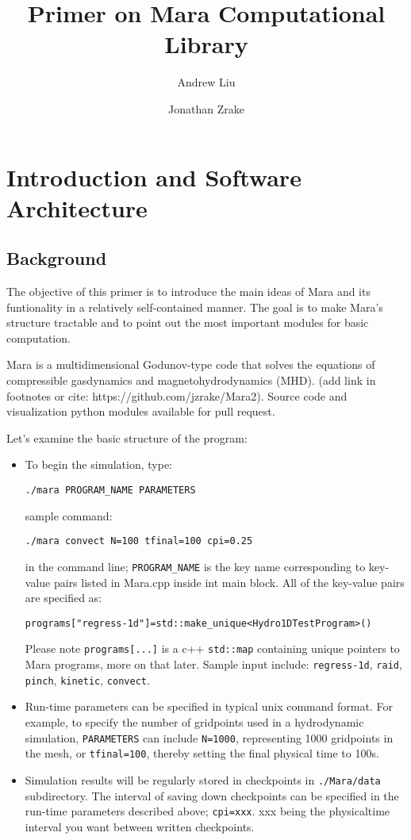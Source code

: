 \documentclass{article}
\title{Primer on Mara Computational Library}
\author{Andrew Liu \and Jonathan Zrake}
\begin{document}
\maketitle

\section{Introduction and Software Architecture}
\subsection{Background}
The objective of this primer is to introduce the main ideas of Mara and its funtionality in a relatively self-contained manner. The goal is to make Mara's structure tractable and to point out the most important modules for basic computation.

Mara is a multidimensional Godunov-type code that solves the equations of
compressible gasdynamics and magnetohydrodynamics (MHD). (add link in footnotes or cite: https://github.com/jzrake/Mara2). Source code and visualization python modules available for pull request.

Let's examine the basic structure of the program:
\begin{itemize}
	\item To begin the simulation, type: 

	\texttt{./mara PROGRAM\_NAME PARAMETERS}

	sample command:

\texttt{./mara convect N=100 tfinal=100 cpi=0.25}
	
in the command line; \texttt{PROGRAM\_NAME} is the key name corresponding to key-value pairs listed in Mara.cpp inside int main block. All of the key-value pairs are specified as: 

\texttt{programs["regress-1d"]=std::make\_unique<Hydro1DTestProgram>()}

Please note \texttt{programs[...]} is a c++ \texttt{std::map} containing unique pointers to Mara programs, more on that later. Sample input include: \texttt{regress-1d}, \texttt{raid}, \texttt{pinch}, \texttt{kinetic}, \texttt{convect}.

	\item Run-time parameters can be specified in typical unix command format. For example, to specify the number of gridpoints used in a hydrodynamic simulation, \texttt{PARAMETERS} can include \texttt{N=1000}, representing 1000 gridpoints in the mesh, or \texttt{tfinal=100}, thereby setting the final physical time to 100s.  
	
	\item Simulation results will be regularly stored in checkpoints in \texttt{./Mara/data} subdirectory. The interval of saving down checkpoints can be specified in the run-time parameters described above; \texttt{cpi=xxx}. xxx being the physicaltime interval you want between written checkpoints.
	

\end{itemize}
\end{document}
